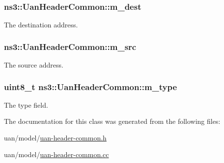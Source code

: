 \subsubsection[{\texorpdfstring{m\+\_\+dest}{m_dest}}]{ ns3\+::\+Uan\+Header\+Common\+::m\+\_\+dest\hspace{0.3cm}{\ttfamily [private]}}\hypertarget{classns3_1_1UanHeaderCommon_a2d1a9633126a057947797399a7e3b90f}{}\label{classns3_1_1UanHeaderCommon_a2d1a9633126a057947797399a7e3b90f}


The destination address. 

\subsubsection[{\texorpdfstring{m\+\_\+src}{m_src}}]{ ns3\+::\+Uan\+Header\+Common\+::m\+\_\+src\hspace{0.3cm}{\ttfamily [private]}}\hypertarget{classns3_1_1UanHeaderCommon_acf5021871e306cfa8c7a65df92974b20}{}\label{classns3_1_1UanHeaderCommon_acf5021871e306cfa8c7a65df92974b20}


The source address. 

\subsubsection[{\texorpdfstring{m\+\_\+type}{m_type}}]{\setlength{\rightskip}{0pt plus 5cm}uint8\+\_\+t ns3\+::\+Uan\+Header\+Common\+::m\+\_\+type\hspace{0.3cm}{\ttfamily [private]}}\hypertarget{classns3_1_1UanHeaderCommon_a8adf1bd97158c56ac1ee8c51263051fc}{}\label{classns3_1_1UanHeaderCommon_a8adf1bd97158c56ac1ee8c51263051fc}


The type field. 



The documentation for this class was generated from the following files\+:\begin{DoxyCompactItemize}
\item 
uan/model/\hyperlink{uan-header-common_8h}{uan-\/header-\/common.\+h}\item 
uan/model/\hyperlink{uan-header-common_8cc}{uan-\/header-\/common.\+cc}\end{DoxyCompactItemize}
